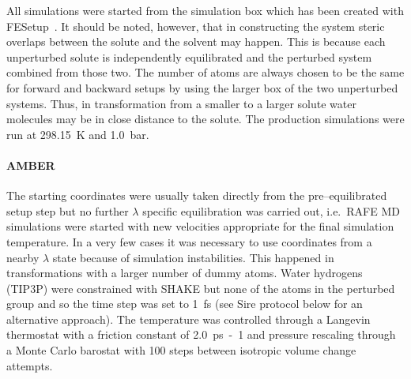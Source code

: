 \documentclass[journal=jctcce,manuscript=article]{achemso}
\begin{document}
All simulations were started from the simulation box which has been 
created with FESetup~\cite{loeffler_fesetup:_2015}.  It should be noted, 
however, that in constructing the system steric overlaps between the solute and 
the solvent may happen.  This is because each unperturbed solute is 
independently equilibrated and the perturbed system combined from those two.  
The number of atoms are always chosen to be the same for forward and backward 
setups by using the larger box of the two unperturbed systems.  Thus, in 
transformation from a smaller to a larger solute water molecules may be in 
close distance to the solute.  The production simulations were run at 
\SI{298.15}{K} and \SI{1.0}{bar}.

\paragraph{AMBER} The starting coordinates were usually taken directly from the
pre--equilibrated setup step but no further $\lambda$ specific equilibration 
was carried out, i.e.\ RAFE MD simulations were started with new velocities appropriate for the 
final simulation temperature.  In a very few cases it was necessary to use 
coordinates from a nearby $\lambda$ state because of simulation instabilities.  
This happened in transformations with a larger number of dummy atoms.  Water 
hydrogens (TIP3P) were constrained with SHAKE but none of the atoms in the 
perturbed group and so the time step was set to \SI{1}{fs} (see Sire protocol 
below for an alternative approach).  The temperature was controlled through a 
Langevin thermostat with a friction constant of \SI{2.0}{ps-1} and pressure 
rescaling through a Monte Carlo barostat with 100 steps between isotropic 
volume change attempts.
\end{document}

